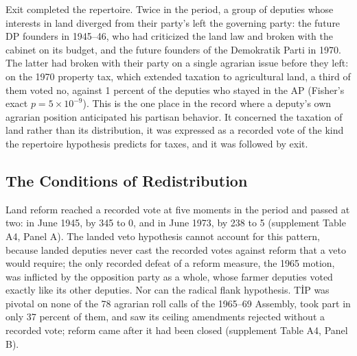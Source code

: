 \documentclass[12pt]{article}
\begin{document}
Exit completed the repertoire. Twice in the period, a group of deputies whose interests in land diverged from their party's left the governing party: the future DP founders in 1945--46, who had criticized the land law and broken with the cabinet on its budget, and the future founders of the Demokratik Parti in 1970. The latter had broken with their party on a single agrarian issue before they left: on the 1970 property tax, which extended taxation to agricultural land, a third of them voted no, against 1 percent of the deputies who stayed in the AP (Fisher's exact $p=5\times10^{-9}$). This is the one place in the record where a deputy's own agrarian position anticipated his partisan behavior. It concerned the taxation of land rather than its distribution, it was expressed as a recorded vote of the kind the repertoire hypothesis predicts for taxes, and it was followed by exit.

\subsection*{The Conditions of Redistribution}

Land reform reached a recorded vote at five moments in the period and passed at two: in June 1945, by 345 to 0, and in June 1973, by 238 to 5 (supplement Table A4, Panel A). The landed veto hypothesis cannot account for this pattern, because landed deputies never cast the recorded votes against reform that a veto would require; the only recorded defeat of a reform measure, the 1965 motion, was inflicted by the opposition party as a whole, whose farmer deputies voted exactly like its other deputies. Nor can the radical flank hypothesis. TİP was pivotal on none of the 78 agrarian roll calls of the 1965--69 Assembly, took part in only 37 percent of them, and saw its ceiling amendments rejected without a recorded vote; reform came after it had been closed (supplement Table A4, Panel B).
\end{document}
